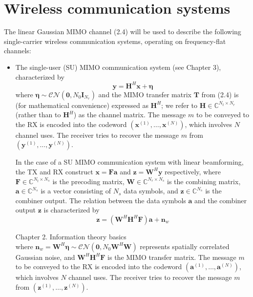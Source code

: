 \documentclass[11pt,a4paper]{report}
\begin{document}
\section{Wireless communication systems}

The linear Gaussian MIMO channel (2.4) will be used to describe the following single-carrier wireless communication systems, operating on frequency-flat channels:
\begin{itemize}
    \item The single-user (SU) MIMO communication system (see Chapter 3), characterized by
    \begin{equation*}
        \mathbf{y} = \mathbf{H}^H \mathbf{x} + \boldsymbol{\eta}
    \end{equation*}
    where $\boldsymbol{\eta} \sim \mathcal{CN}(\mathbf{0}, N_0 \mathbf{I}_{N_r})$ and the MIMO transfer matrix $\mathbf{T}$ from (2.4) is (for mathematical convenience) expressed as $\mathbf{H}^H$; we refer to $\mathbf{H} \in \mathbb{C}^{N_t \times N_r}$ (rather than to $\mathbf{H}^H$) as the channel matrix. The message $m$ to be conveyed to the RX is encoded into the codeword $(\mathbf{x}^{(1)}, \dots, \mathbf{x}^{(N)})$, which involves $N$ channel uses. The receiver tries to recover the message $m$ from $(\mathbf{y}^{(1)}, \dots, \mathbf{y}^{(N)})$.

    In the case of a SU MIMO communication system with linear beamforming, the TX and RX construct $\mathbf{x} = \mathbf{F}\mathbf{a}$ and $\mathbf{z} = \mathbf{W}^H \mathbf{y}$ respectively, where $\mathbf{F} \in \mathbb{C}^{N_t \times N_s}$ is the precoding matrix, $\mathbf{W} \in \mathbb{C}^{N_r \times N_s}$ is the combining matrix, $\mathbf{a} \in \mathbb{C}^{N_s}$ is a vector consisting of $N_s$ data symbols, and $\mathbf{z} \in \mathbb{C}^{N_s}$ is the combiner output. The relation between the data symbols $\mathbf{a}$ and the combiner output $\mathbf{z}$ is characterized by
    \begin{equation*}
        \mathbf{z} = (\mathbf{W}^H \mathbf{H}^H \mathbf{F})\mathbf{a} + \mathbf{n}_w
    \end{equation*}

\newpage
 \hfill Chapter 2. Information theory basics \\

    \noindent where $\mathbf{n}_w = \mathbf{W}^H \boldsymbol{\eta} \sim \mathcal{CN}(\mathbf{0}, N_0 \mathbf{W}^H \mathbf{W})$ represents spatially correlated Gaussian noise, and $\mathbf{W}^H \mathbf{H}^H \mathbf{F}$ is the MIMO transfer matrix. The message $m$ to be conveyed to the RX is encoded into the codeword $(\mathbf{a}^{(1)}, \dots, \mathbf{a}^{(N)})$, which involves $N$ channel uses. The receiver tries to recover the message $m$ from $(\mathbf{z}^{(1)}, \dots, \mathbf{z}^{(N)})$.


\end{itemize}
\end{document}

